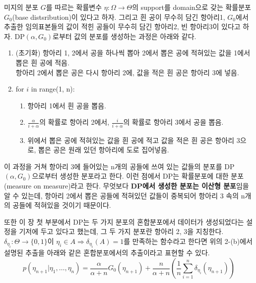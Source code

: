 \documentclass{article}
\begin{document}
\noindent 미지의 분포 $G$를 따르는 확률변수 $\eta:\Omega\to\Theta$의 support를 domain으로 갖는 확률분포 $G_0$(base distsribution)이 있다고 하자.
그리고 흰 공이 무수히 담긴 항아리1, $G_0$에서 추출한 임의표본들의 값이 적힌 공들이 무수히 담긴 항아리2, 빈 항아리3이 있다고 하자.
DP$(\alpha,G_0)$로부터 값의 분포를 생성하는 과정은 아래와 같다.
\begin{enumerate}
    \item (초기화) 항아리 1, 2에서 공을 하나씩 뽑아 2에서 뽑은 공에 적혀있는 값을 1에서 뽑은 흰 공에 적음.\\
    항아리 2에서 뽑은 공은 다시 항아리 2에, 값을 적은 흰 공은 항아리 3에 넣음.
    \item for $i$ in range(1, n):
    \begin{enumerate}
        \item 항아리 1에서 흰 공을 뽑음.
        \item $\displaystyle\frac{\alpha}{i+\alpha}$의 확률로 항아리 2에서, $\displaystyle\frac{i}{i+\alpha}$의 확률로 항아리 3에서 공을 뽑음.
        \item 위에서 뽑은 공에 적혀있는 값을 흰 공에 적고 값을 적은 흰 공은 항아리 3으로, 뽑은 공은 원래 있던 항아리에 도로 집어넣음.
    \end{enumerate}
\end{enumerate}
이 과정을 거쳐 항아리 3에 들어있는 n개의 공들에 쓰여 있는 값들의 분포를 DP$(\alpha,G_0)$으로부터 생성한 분포라고 한다.
이런 점에서 DP는 확률분포에 대한 분포(measure on measure)라고 한다.
무엇보다 \textbf{DP에서 생성한 분포는 이산형 분포}임을 알 수 있는데, 항아리 2에서 뽑은 공들에 적혀있던 값들이 중복되어 항아리 3 속의 n개의 공들에 적혀있을 것이기 때문이다.\bigskip

\noindent 또한 이 장 첫 부분에서 DP는 두 가지 분포의 혼합분포에서 데이터가 생성되었다는 설정을 기저에 두고 있다고 했는데, 그 두 가지 분포란 항아리 2, 3을 지칭한다.
$\delta_{\eta_i}:\Theta\to\{0,1\}$이 $\eta_i\in A\Rightarrow\delta_{\eta_i}(A)=1$를 만족하는 함수라고 한다면 위의 2-(b)에서 설명된 추출을 아래와 같은 혼합분포에서의 추출이라고 표현할 수 있다.
\begin{equation}
    p(\eta_{n+1}|\eta_1,\ldots,\eta_n)=\frac{\alpha}{\alpha+n}G_0(\eta_{n+1})+\frac{n}{\alpha+n}\left(\frac{1}{n}\sum_{i=1}^n\delta_{\eta_i}(\eta_{n+1})\right)
\end{equation}
\end{document}
